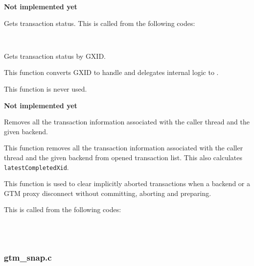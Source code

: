   
    \textbf{Not implemented yet}
  
  
    Gets transaction status.
    This is called from the following codes:
    
    \FuncRefHdr
		\\
		\hline
    \FuncRefTrailor
  
  
    Gets transaction status by GXID.
    
    This function converts GXID to handle and delegates internal logic to  .
    
    This function is never used.
  
  
    \textbf{Not implemented yet}
  
  
    Removes all the transaction information associated with the caller thread and the given backend.
    
    This function removes all the transaction information associated with the caller thread and the given backend from opened transaction list.
    This also calculates \texttt{latestCompletedXid}.
    
    This function is used to clear implicitly aborted transactions when a backend or a GTM proxy disconnect without committing, aborting and preparing.
    
    This is called from the following codes:
    
    \FuncRefHdr
		\\
		\\
		\hline
    \FuncRefTrailor



\subsubsection{gtm\_snap.c}

